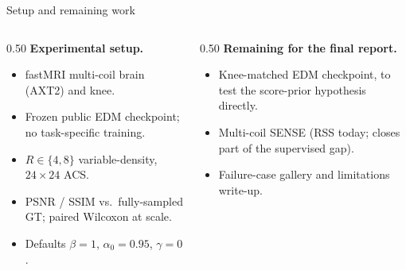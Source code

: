 \documentclass[aspectratio=169]{beamer}
\begin{document}
\begin{frame}{Setup and remaining work}
  \small
  \begin{columns}[T]
    \begin{column}{0.50\textwidth}
      \textbf{Experimental setup.}
      \begin{itemize}
        \item fastMRI multi-coil brain (AXT2) and knee.
        \item Frozen public EDM checkpoint; no task-specific training.
        \item $R \in \{4,8\}$ variable-density, $24{\times}24$ ACS.
        \item PSNR / SSIM vs.\ fully-sampled GT; paired Wilcoxon at scale.
        \item Defaults $\beta{=}1$, $\alpha_0{=}0.95$, $\gamma{=}0$.
      \end{itemize}
    \end{column}
    \begin{column}{0.50\textwidth}
      \textbf{Remaining for the final report.}
      \begin{itemize}
        \item Knee-matched EDM checkpoint, to test the score-prior hypothesis directly.
        \item Multi-coil SENSE (RSS today; closes part of the supervised gap).
        \item Failure-case gallery and limitations write-up.
      \end{itemize}
    \end{column}
  \end{columns}
\end{frame}
\end{document}
